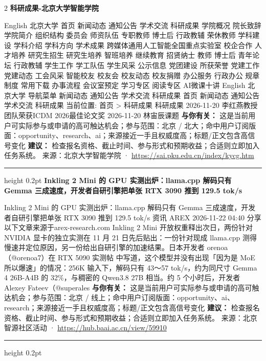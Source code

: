 \documentclass[10.5pt]{ctexart}
\begin{document}
\begin{multicols}{2}
{\large\bfseries 科研成果-北京大学智能学院}\par
English 北京大学 首页 新闻动态 通知公告 学术交流 科研成果 学院概况 院长致辞 学院简介 组织结构 委员会 师资队伍 专职教师 博士后 行政教辅 荣休教师 学科建设 学科介绍 学科方向 学术成果 跨媒体通用人工智能全国重点实验室 校企合作 人才培养 研究生招生 研究生培养 智班培养 继续教育 招贤纳士 教师 博士后 青年论坛 行政教辅 学生工作 学工队伍 学生风采 公示信息 党团建设 所获荣誉 党建工作 党建动态 工会风采 智能校友 校友会 校友动态 校友捐赠 办公服务 行政办公 规章制度 常用下载 办事流程 会议室预定 学习专区 阅读专区 AI微课十讲 English 北京大学 导航菜单 新闻动态 通知公告 学术交流 科研成果 首页 新闻动态 通知公告 学术交流 科研成果 当前位置: 首页 > 科研成果 科研成果 2026-11-20 李红燕教授团队荣获ICDM 2026最佳论文奖 2026-11-20 林宙辰课题
\textbf{与你有关：} 这是当前用户可实际参与或申请的高可触达机会；参与范围：北京 / 北大；命中用户订阅版面：opportunity、research、ai；来源接近一手且权威度高；标题/正文包含高信号变化
\textbf{建议：} 检查报名资格、截止时间、参与形式和预期收益；合适则立即加入任务系统。
{\footnotesize\color{ormuted} 来源：北京大学智能学院 · \url{https://sai.pku.edu.cn/index/kycg.htm}}
\vspace{2mm}
\hrule height 0.2pt
\vspace{2mm}
{\large\bfseries Inkling 2 Mini 的 GPU 实测出炉：llama.cpp 解码只有 Gemma 三成速度，开发者自研引擎把单张 RTX 3090 推到 129.5 tok/s}\par
Inkling 2 Mini 的 GPU 实测出炉：llama.cpp 解码只有 Gemma 三成速度，开发者自研引擎把单张 RTX 3090 推到 129.5 tok/s 资讯 AREX 2026-11-22 04:40 分享 以下文章来源于arex-research.com Inkling 2 Mini 开放权重释出次日，两份针对 NVIDIA 显卡的独立实测在 11 月 21 日先后贴出：一份针对现成 llama.cpp 测得慢速并定位原因，另一份给出自研引擎的加速结果。日本开发者 orenoa（@orenoa7）在 RTX 5090 实测帖 中写道，这个模型并没有出现「因为是 MoE 所以爆速」的情况：256K 输入下，解码只有 43～57 tok/s，约为同尺寸 Gemma 4 26B-A4B 的 32\%，与稠密的 Qwen3.8 27B 相当。约 5 个小时后，开发者 Alexey Fateev（@superales
\textbf{与你有关：} 这是当前用户可实际参与或申请的高可触达机会；参与范围：北京 / 线上；命中用户订阅版面：opportunity、ai、research；来源接近一手且权威度高；标题/正文包含高信号变化
\textbf{建议：} 检查报名资格、截止时间、参与形式和预期收益；合适则立即加入任务系统。
{\footnotesize\color{ormuted} 来源：北京智源社区活动 · \url{https://hub.baai.ac.cn/view/59910}}
\vspace{2mm}
\hrule height 0.2pt
\vspace{2mm}

\end{multicols}
\end{document}
